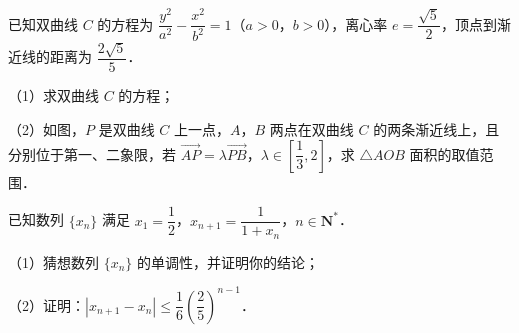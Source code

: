 \begingroup
\renewenvironment{question}{\Needspace{0.5\textheight}}{}
\begin{question}
已知双曲线 $C$ 的方程为 $\dfrac{y^2}{a^2}-\dfrac{x^2}{b^2}=1$（$a>0$，$b>0$），离心率 $e=\dfrac{\sqrt5}2$，顶点到渐近线的距离为 $\dfrac{2\sqrt5}5$．

（1）求双曲线 $C$ 的方程；

（2）如图，$P$ 是双曲线 $C$ 上一点，$A$，$B$ 两点在双曲线 $C$ 的两条渐近线上，且分别位于第一、二象限，若 $\overrightarrow{AP}=\lambda\overrightarrow{PB}$，$\lambda\in\left[\dfrac13,2\right]$，求 $\triangle AOB$ 面积的取值范围．
\nopagebreak[4]
\begin{center}\end{center}
\nopagebreak[4]
\end{question}
\endgroup
\begin{question}
已知数列 $\{x_n\}$ 满足 $x_1=\dfrac12$，$x_{n+1}=\dfrac1{1+x_n}$，$n\in\mathbf N^*$．

（1）猜想数列 $\{x_n\}$ 的单调性，并证明你的结论；

（2）证明：$|x_{n+1}-x_n|\leqslant\dfrac16\left(\dfrac25\right)^{n-1}$．

\end{question}